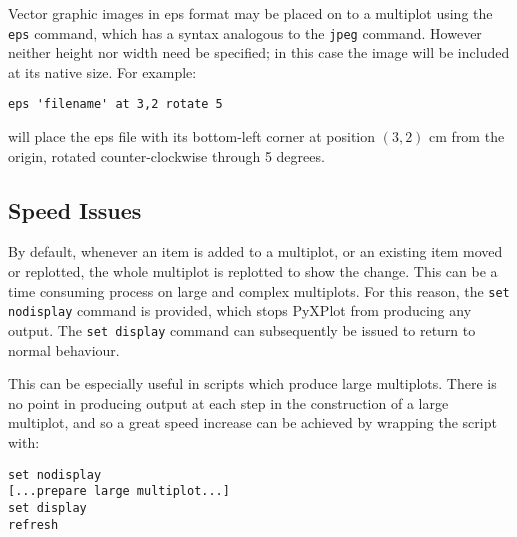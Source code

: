  Vector graphic images in eps format may
be placed on to a multiplot using the {\tt eps} command, which has a syntax
analogous to the {\tt jpeg} command.  However neither height nor width need be
specified; in this case the image will be included at its native size.  For
example:

\begin{verbatim}
eps 'filename' at 3,2 rotate 5
\end{verbatim}

\noindent will place the eps file with its bottom-left corner at position
$(3,2)$ cm from the origin, rotated counter-clockwise through 5 degrees.

\subsection{Speed Issues}
\label{set_display}

By default, whenever an item is added to a multiplot, or an existing item moved
or replotted, the whole multiplot is replotted to show the change. This can be
a time consuming process on large and complex multiplots. For this reason, the
{\tt set nodisplay}
command is provided, which stops PyXPlot from producing any output. The
{\tt set display} command can subsequently be issued to return to normal
behaviour.

This can be especially useful in scripts which produce large multiplots. There
is no point in producing output at each step in the construction of a large
multiplot, and so a great speed increase can be achieved by wrapping the script
with:

\begin{verbatim} 
set nodisplay
[...prepare large multiplot...]
set display
refresh
\end{verbatim}

